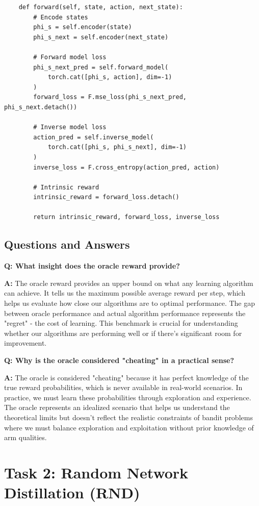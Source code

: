 \documentclass[12pt]{article}
\begin{document}
{{{\begin{verbatim}
    def forward(self, state, action, next_state):
        # Encode states
        phi_s = self.encoder(state)
        phi_s_next = self.encoder(next_state)
        
        # Forward model loss
        phi_s_next_pred = self.forward_model(
            torch.cat([phi_s, action], dim=-1)
        )
        forward_loss = F.mse_loss(phi_s_next_pred, phi_s_next.detach())
        
        # Inverse model loss
        action_pred = self.inverse_model(
            torch.cat([phi_s, phi_s_next], dim=-1)
        )
        inverse_loss = F.cross_entropy(action_pred, action)
        
        # Intrinsic reward
        intrinsic_reward = forward_loss.detach()
        
        return intrinsic_reward, forward_loss, inverse_loss
\end{verbatim}

\subsection{Questions and Answers}

\textbf{Q: What insight does the oracle reward provide?}

\textbf{A:} The oracle reward provides an upper bound on what any learning algorithm can achieve. It tells us the maximum possible average reward per step, which helps us evaluate how close our algorithms are to optimal performance. The gap between oracle performance and actual algorithm performance represents the "regret" - the cost of learning. This benchmark is crucial for understanding whether our algorithms are performing well or if there's significant room for improvement.

\textbf{Q: Why is the oracle considered "cheating" in a practical sense?}

\textbf{A:} The oracle is considered "cheating" because it has perfect knowledge of the true reward probabilities, which is never available in real-world scenarios. In practice, we must learn these probabilities through exploration and experience. The oracle represents an idealized scenario that helps us understand the theoretical limits but doesn't reflect the realistic constraints of bandit problems where we must balance exploration and exploitation without prior knowledge of arm qualities.

\section{Task 2: Random Network Distillation (RND)}

}}}
\end{document}
